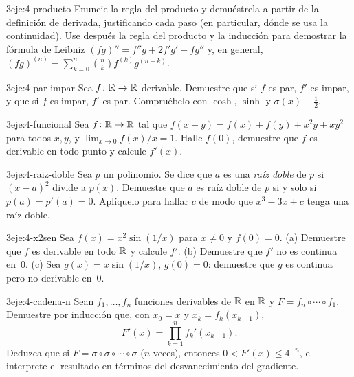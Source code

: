 \begin{ejercicio}{3}{eje:4-producto}
Enuncie la regla del producto y demuéstrela a partir de la definición de derivada, justificando cada paso (en particular, dónde se usa la continuidad). Use después la regla del producto y la inducción para demostrar la fórmula de Leibniz $(fg)''=f''g+2f'g'+fg''$ y, en general, $(fg)^{(n)}=\sum_{k=0}^{n}\binom nkf^{(k)}g^{(n-k)}$.
\end{ejercicio}

\begin{ejercicio}{3}{eje:4-par-impar}
Sea $f\colon\mathbb{R}\to\mathbb{R}$ derivable. Demuestre que si $f$ es par, $f'$ es impar, y que si $f$ es impar, $f'$ es par. Compruébelo con $\cosh$, $\sinh$ y $\sigma(x)-\tfrac12$.
\end{ejercicio}

\begin{ejercicio}{3}{eje:4-funcional}
Sea $f\colon\mathbb{R}\to\mathbb{R}$ tal que $f(x+y)=f(x)+f(y)+x^{2}y+xy^{2}$ para todos $x,y$, y $\lim_{x\to0}f(x)/x=1$. Halle $f(0)$, demuestre que $f$ es derivable en todo punto y calcule $f'(x)$.
\end{ejercicio}

\begin{ejercicio}{3}{eje:4-raiz-doble}
Sea $p$ un polinomio. Se dice que $a$ es una \emph{raíz doble} de $p$ si $(x-a)^{2}$ divide a $p(x)$. Demuestre que $a$ es raíz doble de $p$ si y solo si $p(a)=p'(a)=0$. Aplíquelo para hallar $c$ de modo que $x^{3}-3x+c$ tenga una raíz doble.
\end{ejercicio}

\begin{ejercicio}{3}{eje:4-x2sen}
Sea $f(x)=x^{2}\sin(1/x)$ para $x\ne0$ y $f(0)=0$. (a) Demuestre que $f$ es derivable en todo $\mathbb{R}$ y calcule $f'$. (b) Demuestre que $f'$ no es continua en~0. (c) Sea $g(x)=x\sin(1/x)$, $g(0)=0$: demuestre que $g$ es continua pero no derivable en~0.
\end{ejercicio}

\begin{ejercicio}{3}{eje:4-cadena-n}
Sean $f_1,\dots,f_n$ funciones derivables de $\mathbb{R}$ en $\mathbb{R}$ y $F=f_n\circ\cdots\circ f_1$. Demuestre por inducción que, con $x_0=x$ y $x_k=f_k(x_{k-1})$,
\[
F'(x)=\prod_{k=1}^{n}f_k'(x_{k-1}).
\]
Deduzca que si $F=\sigma\circ\sigma\circ\cdots\circ\sigma$ ($n$ veces), entonces $0<F'(x)\le4^{-n}$, e interprete el resultado en términos del desvanecimiento del gradiente.
\end{ejercicio}
